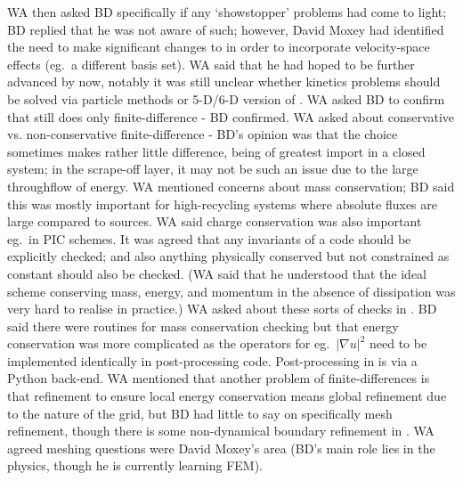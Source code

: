 WA then asked BD specifically if any `showstopper' problems had come to light; BD 
replied that he was not aware of such; however, David Moxey had identified the 
need to make significant changes to  in order to incorporate 
velocity-space effects (eg.\ a different basis set).  WA said that
he had hoped to be further advanced by now, notably it was still unclear whether 
kinetics problems should be solved via particle methods or 5-D/6-D version of 
.  WA asked BD to confirm that  still does only 
finite-difference - BD confirmed.  WA asked about conservative vs. 
non-conservative finite-difference - BD's opinion was that the choice sometimes 
makes rather little difference, being of greatest import in a closed system; in 
the scrape-off layer, it may not be such an issue due to the large throughflow 
of energy.  WA mentioned concerns about mass conservation; BD said this was 
mostly important for high-recycling systems where absolute fluxes are large 
compared to sources.  WA said charge conservation was also important eg.\ in 
PIC schemes.  It was agreed that any invariants of a code should be explicitly 
checked; and also anything physically conserved but not constrained as constant 
should also be checked.  (WA said that he understood that the ideal scheme conserving mass,
energy, and momentum in the absence of dissipation was very hard to realise in practice.)
WA asked about these sorts of checks in .
BD said there were routines for mass conservation checking but that 
energy conservation was more complicated as the operators for eg.\ $\lvert 
\nabla u \rvert^2$ need to be implemented identically in post-processing code.
Post-processing in 
 is via a Python back-end.  WA mentioned that another problem of 
finite-differences is that refinement to ensure local energy conservation means 
global refinement due to the nature of the grid, but  BD had little to say on 
specifically mesh refinement, though there is some non-dynamical boundary 
refinement in .  WA agreed meshing questions were David Moxey's 
area (BD's main role lies in the physics, though he is currently learning FEM).
  

